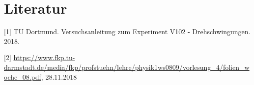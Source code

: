 \section{Literatur}

[1] TU Dortmund. Versuchsanleitung zum Experiment V102 - Drehschwingungen. 2018. 

[2] \url{https://www.fkp.tu-darmstadt.de/media/fkp/profstuehn/lehre/physik1ws0809/vorlesung_4/folien_woche_08.pdf}, 28.11.2018